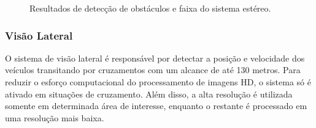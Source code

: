 \begin{figure}[h]
\centering
{}\quad
{}\quad
{}
\caption{Resultados de detecção de obstáculos e faixa do sistema estéreo.}%
\label{fig:stereo}%
\end{figure}


\subsubsection{Visão Lateral}

O sistema de visão lateral é responsável por detectar a posição e velocidade dos veículos transitando por cruzamentos com um alcance de até 130 metros. Para reduzir o esforço computacional do processamento de imagens HD, o sistema só é ativado em situações de cruzamento. Além disso, a alta resolução é utilizada somente em determinada área de interesse, enquanto o restante é processado em uma resolução mais baixa.

